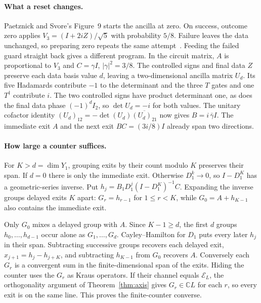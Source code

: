 \documentclass[acmsmall,screen,review,anonymous,nonacm]{acmart}
\newcommand{\C}{\mathbb C}
\numberwithin{equation}{section}
\newcommand{\chan}[1]{\mathcal E_{#1}}
\begin{document}
\paragraph{What a reset changes.}\label{app:retry}
Paetznick and Svore's Figure~9 starts the ancilla at zero. On success, outcome zero applies $V_3=(I+2iZ)/\sqrt5$ with probability $5/8$. Failure leaves the data unchanged, so preparing zero repeats the same attempt~\cite[Fig.~9]{PaetznickSvore14RUS}. Feeding the failed guard straight back gives a different program. In the circuit matrix, $A$ is proportional to $V_3$ and $C=\gamma I$, $|\gamma|^2=3/8$. The controlled signs and final data $Z$ preserve each data basis value $d$,
leaving a two-dimensional ancilla matrix $U_d$. Its five Hadamards contribute
$-1$ to the determinant and the three $T$ gates and one $T^\dagger$ contribute
$i$. The two controlled signs have product determinant one, as does the final
data phase $(-1)^dI_2$, so $\det U_d=-i$ for both values. The unitary cofactor
identity $(U_d)_{12}=-\det(U_d)\overline{(U_d)_{21}}$ now gives $B=i\,\bar\gamma I$. The immediate exit $A$ and the next exit $BC=(3i/8)I$ already span two directions.

\paragraph{How large a counter suffices.}\label{app:counter-size}
For $K>d=\dim Y_1$, grouping exits by their count modulo $K$ preserves their span. If $d=0$ there is only the immediate exit. Otherwise $D_1^k\to0$, so $I-D_1^K$ has a geometric-series inverse.
Put $h_j=B_1D_1^j(I-D_1^K)^{-1}C$. Expanding the inverse groups delayed exits $K$ apart: $G_r=h_{r-1}$ for $1\le r<K$, while $G_0=A+h_{K-1}$ also contains the immediate exit.

Only $G_0$ mixes a delayed group with $A$. Since $K-1\ge d$, the first
$d$ groups $h_0,\ldots,h_{d-1}$ occur alone as $G_1,\ldots,G_d$.
Cayley--Hamilton for $D_1$ puts every later $h_j$ in their span.
Subtracting successive groups recovers each delayed exit, $x_{j+1}=h_j-h_{j+K}$,
and subtracting $h_{K-1}$ from $G_0$ recovers $A$. Conversely each $G_r$ is a convergent
sum in the finite-dimensional span of the exits. Hiding the counter uses the $G_r$ as
Kraus operators. If their channel equals $\chan L$, the orthogonality argument
of Theorem~\ref{thm:axis} gives $G_r\in\C L$ for each $r$, so every exit is on the
same line. This proves the finite-counter converse.
\end{document}
